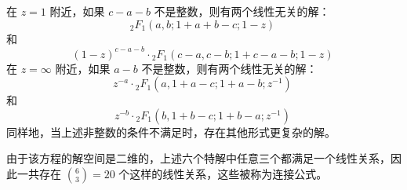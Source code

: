 在 $z = 1$ 附近，如果 $c - a - b$ 不是整数，则有两个线性无关的解：
$$
{}_2F_1(a, b; 1 + a + b - c; 1 - z)~
$$
和
$$
(1 - z)^{c - a - b} \cdot {}_2F_1(c - a, c - b; 1 + c - a - b; 1 - z)~
$$
在 $z = \infty$ 附近，如果 $a - b$ 不是整数，则有两个线性无关的解：
$$
z^{-a} \cdot {}_2F_1\left(a, 1 + a - c; 1 + a - b; z^{-1}\right)~
$$
和
$$
z^{-b} \cdot {}_2F_1\left(b, 1 + b - c; 1 + b - a; z^{-1}\right)~
$$
同样地，当上述非整数的条件不满足时，存在其他形式更复杂的解。

由于该方程的解空间是二维的，上述六个特解中任意三个都满足一个线性关系，因此一共存在 $\binom{6}{3} = 20$ 个这样的线性关系，这些被称为连接公式。
